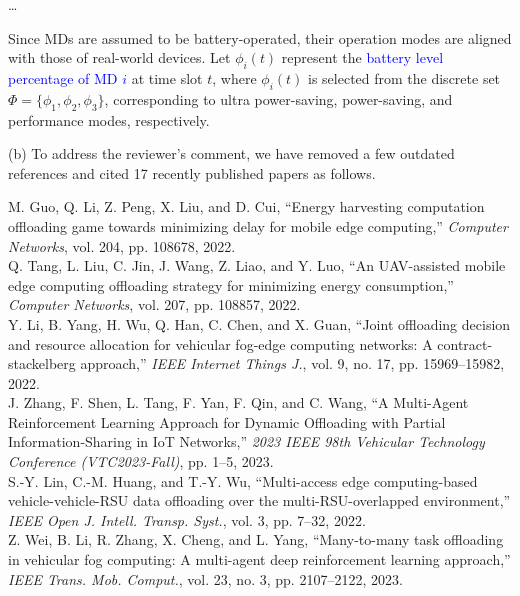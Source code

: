 \documentclass[12pt,draftclsnofoot,onecolumn]{IEEEtran}
\newcommand{\rev}[1]{{\color{blue}#1}} %
\newcommand{\rev}[1]{#1}
\newenvironment{my}[2]%
{\begin{list}{}%
{\setlength{\rightmargin}{#1}\setlength{\leftmargin}{#2}}%


 \item[]{}

} {\end{list}}
\begin{document}
\begin{enumerate}
\begin{my}{1cm}{1cm}
{		\dots
		
Since MDs are assumed to be battery-operated, their operation modes are aligned with those of real-world devices. Let $\phi_i(t)$ represent the \textcolor{blue}{battery level percentage of MD $i$} at time slot $t$, where $\phi_i(t)$ is selected from the discrete set $\Phi = \{\phi_1, \phi_2, \phi_3\}$, corresponding to ultra power-saving, power-saving, and performance modes, respectively.
}
\end{my}\vspace{6mm}

(b) To address the reviewer’s comment, we have removed a few outdated references and cited 17 recently published papers as follows. \newline

		\begin{my}{1cm}{1cm}
	\rev{
		{\small
			\noindent\hspace{-0.1mm}\cite{guo2022energy} M. Guo, Q. Li, Z. Peng, X. Liu, and D. Cui, ``Energy harvesting computation offloading game towards minimizing delay for mobile edge computing,'' \textit{Computer Networks}, vol. 204, pp. 108678, 2022.\\[6pt]
			\cite{tang2022uav} Q. Tang, L. Liu, C. Jin, J. Wang, Z. Liao, and Y. Luo, ``An UAV-assisted mobile edge computing offloading strategy for minimizing energy consumption,'' \textit{Computer Networks}, vol. 207, pp. 108857, 2022.\\[6pt]
			\cite{li2022joint} Y. Li, B. Yang, H. Wu, Q. Han, C. Chen, and X. Guan, ``Joint offloading decision and resource allocation for vehicular fog-edge computing networks: A contract-stackelberg approach,'' \textit{IEEE Internet Things J.}, vol. 9, no. 17, pp. 15969--15982, 2022.\\[6pt]
			\cite{zhang2023multi} J. Zhang, F. Shen, L. Tang, F. Yan, F. Qin, and C. Wang, ``A Multi-Agent Reinforcement Learning Approach for Dynamic Offloading with Partial Information-Sharing in IoT Networks,'' \textit{2023 IEEE 98th Vehicular Technology Conference (VTC2023-Fall)}, pp. 1--5, 2023.\\[6pt]
			\cite{lin2022multi} S.-Y. Lin, C.-M. Huang, and T.-Y. Wu, ``Multi-access edge computing-based vehicle-vehicle-RSU data offloading over the multi-RSU-overlapped environment,'' \textit{IEEE Open J. Intell. Transp. Syst.}, vol. 3, pp. 7--32, 2022.\\[6pt]
			\cite{wei2023many} Z. Wei, B. Li, R. Zhang, X. Cheng, and L. Yang, ``Many-to-many task offloading in vehicular fog computing: A multi-agent deep reinforcement learning approach,'' \textit{IEEE Trans. Mob. Comput.}, vol. 23, no. 3, pp. 2107--2122, 2023.\\[6pt]
}}
\end{my}
\end{enumerate}
\end{document}
